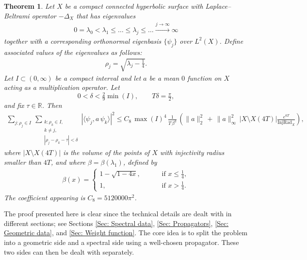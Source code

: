 \documentclass[11pt,twoside,reqno]{amsart} \usepackage{a4wide} \usepackage[T1]{fontenc} \usepackage[utf8]{inputenc} \usepackage{soul}  \usepackage{amsmath} \usepackage{amsfonts} \usepackage{amssymb} \usepackage{mathtools} \usepackage{amsthm} \usepackage{xcolor} \usepackage{graphicx} \usepackage{hyperref} \usepackage{standalone} \usepackage{esint} \usepackage{comment} \usepackage[left=2.3cm,top=3cm,right=2.3cm]{geometry} \usepackage{bm} \usepackage{svg} \usepackage{float} \numberwithin{equation}{section} \theoremstyle{plain} \newtheorem{thm}{Theorem}[section] \newtheorem{theorem}[thm]{Theorem} \newtheorem*{theorem*}{Theorem}\newtheorem{conj}[thm]{Conjecture} \newtheorem{lemma}[thm]{Lemma} \newtheorem{prop}[thm]{Proposition} \newtheorem{proposition}[thm]{Proposition} \newtheorem{cor}[thm]{Corollary} \newtheorem{question}[thm]{Question} \newtheorem{corollary}[thm]{Corollary} \newtheorem{assumption}[thm]{Assumption} \theoremstyle{definition} \newtheorem{defn}[thm]{Definition} \newtheorem{choice}[thm]{Choice} \newtheorem{definition}[thm]{Definition} \newtheorem{ex}[thm]{Example} \newtheorem{notation}[thm]{Notation} \newtheorem*{ack}{Acknowledgements} \theoremstyle{remark} \newtheorem{remark}[thm]{Remark} \newtheorem{bigremark}[thm]{Remark} \usepackage{xcolor} \newcommand{\red}[1]{ {\color{Red}#1} } \newcommand{\blue}[1]{ {\color{Blue}#1} } \author{Kai Hippi} \address{Aalto University, Espoo, Finland} \email{kai.hippi@aalto.fi}
\begin{document}
\begin{theorem*}

Let $ X $ be a compact connected hyperbolic surface with Laplace--Beltrami operator $ -\Delta_{X} $ that has eigenvalues
\begin{align*}
	0 = \lambda_{0} < \lambda_{1} \leq \dots \leq \lambda_{j} \leq \dots \xrightarrow{j \to \infty} \infty
\end{align*}
together with a corresponding orthonormal eigenbasis $ \{ \psi_{j} \} $ over $ L^{2}( X ) $. Define associated values of the eigenvalues as follows: 
\begin{align*}
	\rho_{j} = \sqrt{ \lambda_{j} - \tfrac{1}{4} }.
\end{align*}
Let $I \subset (0,\infty)$ be a compact interval and let $a$ be a mean $0$ function on $ X $ acting as a multiplication operator. Let 
\[
0 < \delta < \tfrac{2}{9} \min(I),
\qquad
T\delta = \tfrac{\pi}{2},
\]
and fix $\tau \in \mathbb{R}$. Then
\begin{align*}
\sum_{j:\rho_j \in I}
\ \sum_{\substack{ k: \rho_{k} \in I, \\ k \neq j, \\ |\rho_j - \rho_k - \tau| < \delta}}
\left| \langle \psi_j, a \, \psi_k \rangle \right|^2
\leq C_{8} \, \max( I )^{4} \, \frac{1}{T \, \beta^{3}} \, \left( \| a \|_{2}^{2} \, + \,  \| a \|_{\infty}^{2} \, | X \setminus X( 4T ) | \frac{e^{6 T}}{ \operatorname{InjRad}_{X} } \right),
\end{align*}
where $ | X \setminus X( 4T ) | $ is the volume of the points of $ X $ with injectivity radius smaller than $ 4T $, and where $\beta = \beta( \lambda_{1} )$, defined by
\begin{align*}
	\beta( x ) = 
	\begin{cases}	
		1 - \sqrt{1 - 4x}, \qquad &\text{ if } x \leq \frac{1}{4},
		\\
		1, \qquad &\text{ if } x > \frac{1}{4}.
	\end{cases}
\end{align*}
The coefficient appearing is $C_{8} = 5120000 \pi^{2}$.

\end{theorem*}

The proof presented here is clear since the technical details are dealt with in different sections; see Sections \ref{Sec: Spectral data}, \ref{Sec: Propagators}, \ref{Sec: Geometric data}, and \ref{Sec: Weight function}. The core idea is to split the problem into a geometric side and a spectral side using a well-chosen propagator. These two sides can then be dealt with separately. 
\end{document}
